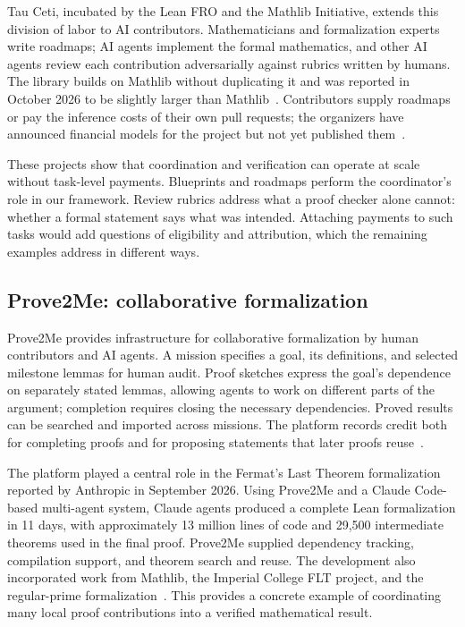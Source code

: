 \documentclass[11pt,a4paper,reqno]{amsart}
\numberwithin{equation}{section}
\begin{document}
Tau Ceti, incubated by the Lean FRO and the Mathlib Initiative, extends this division of labor to AI contributors. Mathematicians and formalization experts write roadmaps; AI agents implement the formal mathematics, and other AI agents review each contribution adversarially against rubrics written by humans. The library builds on Mathlib without duplicating it and was reported in October 2026 to be slightly larger than Mathlib~\cite{tauceti,taucetipost}. Contributors supply roadmaps or pay the inference costs of their own pull requests; the organizers have announced financial models for the project but not yet published them~\cite{taucetipost}.

These projects show that coordination and verification can operate at scale without task-level payments. Blueprints and roadmaps perform the coordinator's role in our framework. Review rubrics address what a proof checker alone cannot: whether a formal statement says what was intended. Attaching payments to such tasks would add questions of eligibility and attribution, which the remaining examples address in different ways.

\subsection{Prove2Me: collaborative formalization}
Prove2Me provides infrastructure for collaborative formalization by human contributors and AI agents. A mission specifies a goal, its definitions, and selected milestone lemmas for human audit. Proof sketches express the goal's dependence on separately stated lemmas, allowing agents to work on different parts of the argument; completion requires closing the necessary dependencies. Proved results can be searched and imported across missions. The platform records credit both for completing proofs and for proposing statements that later proofs reuse~\cite{prove2me}.

The platform played a central role in the Fermat's Last Theorem formalization reported by Anthropic in September 2026. Using Prove2Me and a Claude Code-based multi-agent system, Claude agents produced a complete Lean formalization in 11 days, with approximately 13 million lines of code and 29,500 intermediate theorems used in the final proof. Prove2Me supplied dependency tracking, compilation support, and theorem search and reuse. The development also incorporated work from Mathlib, the Imperial College FLT project, and the regular-prime formalization~\cite{anthropicflt}. This provides a concrete example of coordinating many local proof contributions into a verified mathematical result.
\end{document}
